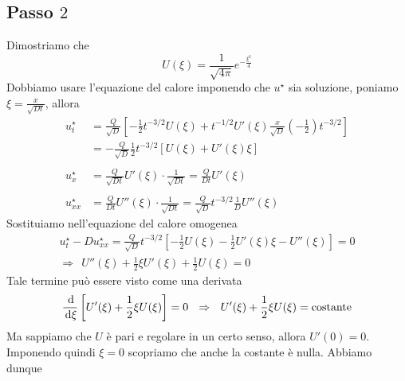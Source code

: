 \subsection{Passo \texorpdfstring{$2$}{2}}

Dimostriamo che
\begin{equation*}
    U(\xi) =\frac{1}{\sqrt{4\pi }} e^{-\frac{\xi ^{2}}{4}}
\end{equation*}
Dobbiamo usare l'equazione del calore imponendo che $u^{\star }$ sia soluzione, poniamo $\xi =\frac{x}{\sqrt{Dt}}$, allora
\begin{align*}
    u^{\star }_{t}  & =\frac{Q}{\sqrt{D}}\left[ -\frac{1}{2} t^{-3/2} U(\xi) +t^{-1/2} U'(\xi)\frac{x}{\sqrt{D}}\left(-\frac{1}{2}\right) t^{-3/2}\right] \\
                    & =-\frac{Q}{\sqrt{D}}\frac{1}{2} t^{-3/2}[ U(\xi) +U'(\xi) \xi ]                                                                     \\
                    &                                                                                                                                     \\
    u^{\star }_{x}  & =\frac{Q}{\sqrt{Dt}} U'(\xi) \cdotp \frac{1}{\sqrt{Dt}} =\frac{Q}{Dt} U'(\xi)                                                       \\
                    &                                                                                                                                     \\
    u^{\star }_{xx} & =\frac{Q}{Dt} U''(\xi) \cdotp \frac{1}{\sqrt{Dt}} =\frac{Q}{\sqrt{D}} t^{-3/2}\frac{1}{D} U''(\xi)
\end{align*}
Sostituiamo nell'equazione del calore omogenea
\begin{gather*}
    u^{\star }_{t} -Du^{\star }_{xx} =\frac{Q}{\sqrt{D}} t^{-3/2}\left[ -\frac{1}{2} U(\xi) -\frac{1}{2} U'(\xi) \xi -U''(\xi)\right] =0\\
    \Rightarrow \ \ U''(\xi) +\frac{1}{2} \xi U'(\xi) +\frac{1}{2} U(\xi) =0
\end{gather*}
Tale termine può essere visto come una derivata
\begin{equation*}
    \frac{\de}{\dxi }\left[ U'(\xi) +\frac{1}{2} \xi U(\xi)\right] =0\ \ \Rightarrow \ \ U'(\xi) +\frac{1}{2} \xi U(\xi) =\text{costante}
\end{equation*}
Ma sappiamo che $U$ è pari e regolare in un certo senso, allora $U'(0) =0$. Imponendo quindi $\xi =0$ scopriamo che anche la costante è nulla. Abbiamo dunque

